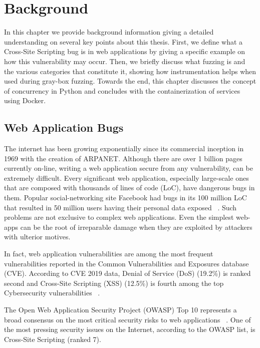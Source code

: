 \chapter{Background}
\label{sec:background}
\minitoc
\vspace*{1cm}

In this chapter we provide background information giving a detailed understanding on several key points about this thesis. First, we define what a Cross-Site Scripting bug is in web applications by giving a specific example on how this vulnerability may occur. Then, we briefly discuss what fuzzing is and the various categories that constitute it, showing how instrumentation helps when used during gray-box fuzzing. Towards the end, this chapter discusses the concept of concurrency in Python and concludes with the containerization of services using Docker.

\section{Web Application Bugs}
The internet has been growing exponentially since its commercial inception in 1969 with the creation of ARPANET. Although there are over 1 billion pages currently on-line, writing a web application secure from any vulnerability, can be extremely difficult. Every significant web application, especially large-scale ones that are composed with thousands of lines of code (LoC), have dangerous bugs in them. Popular social-networking site Facebook had bugs in its 100 million LoC that resulted in 50 million users having their personal data exposed ~\cite{facebook_data_breach,facebook_loc}. Such problems are not exclusive to complex web applications. Even the simplest web-apps can be the root of irreparable damage when they are exploited by attackers with ulterior motives. 

In fact, web application vulnerabilities are among the most frequent vulnerabilities reported in the Common Vulnerabilities and Exposures database (CVE). According to CVE 2019 data, Denial of Service  (DoS) (19.2\%) is ranked second and Cross-Site Scripting (XSS) (12.5\%) is fourth among the top Cybersecurity vulnerabilities ~\cite{cve}.

The Open Web Application Security Project (OWASP) Top 10 represents a broad consensus on the most critical security risks to web applications ~\cite{owasp2017}. One of the most pressing security issues on the Internet, according to the OWASP list, is Cross-Site Scripting (ranked 7).

